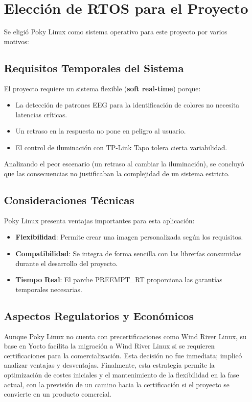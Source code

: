 \newpage
\section{Elección de RTOS para el Proyecto}
    Se eligió Poky Linux como sistema operativo para este proyecto por varios motivos:

    \subsection{Requisitos Temporales del Sistema}
        El proyecto requiere un sistema flexible (\textbf{soft real-time}) porque:
        \begin{itemize}
            \item La detección de patrones EEG para la identificación de colores no necesita latencias críticas.
            \item Un retraso en la respuesta no pone en peligro al usuario.
            \item El control de iluminación con TP-Link Tapo tolera cierta variabilidad.
        \end{itemize}

        Analizando el peor escenario (un retraso al cambiar la iluminación), se concluyó que las consecuencias no justificaban la complejidad de un sistema estricto.

    \subsection{Consideraciones Técnicas}
        Poky Linux presenta ventajas importantes para esta aplicación:
        \begin{itemize}
            \item \textbf{Flexibilidad}: Permite crear una imagen personalizada según los requisitos.
            \item \textbf{Compatibilidad}: Se integra de forma sencilla con las librerías consumidas durante el desarrollo del proyecto.
            \item \textbf{Tiempo Real}: El parche PREEMPT\_RT proporciona las garantías temporales necesarias.
        \end{itemize}

    \subsection{Aspectos Regulatorios y Económicos}
        Aunque Poky Linux no cuenta con precertificaciones como Wind River Linux, su base en Yocto facilita la migración a Wind River Linux si se requieren certificaciones para la comercialización. Esta decisión no fue inmediata; implicó analizar ventajas y desventajas. Finalmente, esta estrategia permite la optimización de costes iniciales y el mantenimiento de la flexibilidad en la fase actual, con la previsión de un camino hacia la certificación si el proyecto se convierte en un producto comercial.


